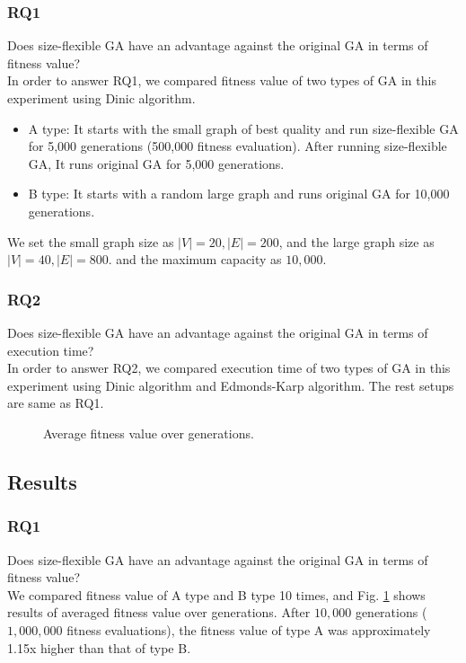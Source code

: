 \documentclass[a4paper, 10pt, conference]{ieeeconf}      %
\begin{document}
\subsubsection{RQ1} Does size-flexible GA have an advantage against the original GA in terms of fitness value?\\
In order to answer RQ1, we compared fitness value of two types of GA in this experiment using Dinic algorithm.
\begin{itemize}
\item A type: It starts with the small graph of best quality and run size-flexible GA for 5,000 generations (500,000 fitness evaluation). After running size-flexible GA, It runs original GA for 5,000 generations.
\item B type: It starts with a random large graph and runs original GA for 10,000 generations.
\end{itemize}

We set the small graph size as $\vert V \vert = 20, \vert E \vert = 200$, and the large graph size as $\vert V \vert = 40, \vert E \vert = 800$. and the maximum capacity as $10,000$.

\subsubsection{RQ2} Does size-flexible GA have an advantage against the original GA in terms of execution time?\\
In order to answer RQ2, we compared execution time of two types of GA in this experiment using Dinic algorithm and Edmonds-Karp algorithm. The rest setups are same as RQ1.

\begin{figure}
  \caption{Average fitness value over generations.}
  \label{fig:averagedGraph}
\end{figure}

\subsection{Results}

\subsubsection*{RQ1} Does size-flexible GA have an advantage against the original GA in terms of fitness value?\\
We compared fitness value of A type and B type 10 times, and Fig. \ref{fig:averagedGraph} shows results of averaged fitness value over generations. After $10,000$ generations ($1,000,000$ fitness evaluations), the fitness value of type A was approximately 1.15x higher than that of type B.
\end{document}
